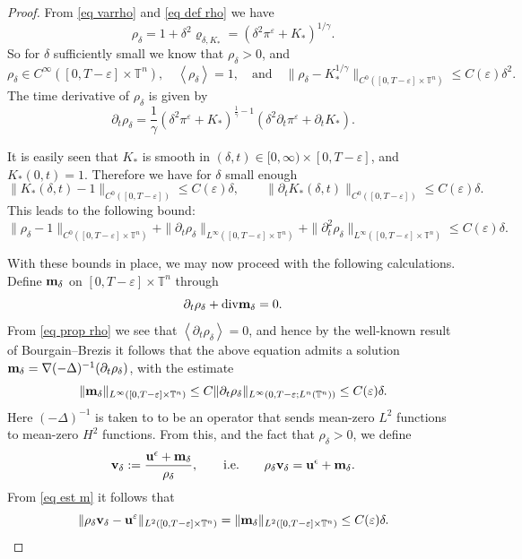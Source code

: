 \documentclass[12pt,reqno]{amsart}
\theoremstyle{definition}
\theoremstyle{remark}
\numberwithin{equation}{section}
\renewcommand{\u}{{\bf u}}
\newcommand{\Dv}{{\rm div}}
\newcommand{\T}{{\mathbb T}}
\renewcommand{\v}{{\bf v}}
\newcommand{\m}{{\bf m}}
\newcommand{\eps}{{\varepsilon}}
\begin{document}
\begin{proof}
From \eqref{eq varrho} and \eqref{eq def rho} we have 
\[
\rho_\delta = 1 + \delta^2 \varrho_{\delta, K_\ast} = (\delta^2 \pi^\varepsilon + K_\ast)^{1/\gamma}.
\]
So for $\delta$ sufficiently small we know that $\rho_\delta > 0$, and 
\begin{equation}\label{eq prop rho}
\rho_\delta \in C^\infty([0, T-\varepsilon] \times \T^n), \quad \left\langle \rho_\delta \right\rangle = 1, \quad \text{and} \quad \|\rho_{\delta} - K_\ast^{1/\gamma}\|_{C^0([0,T-\varepsilon] \times\mathbb{T}^n)} \le C(\varepsilon) \delta^2.
\end{equation}
The time derivative of $ \rho_{\delta} $ is given by
\[
\partial_t \rho_{\delta} = \frac{1}{\gamma} \left(\delta^2 \pi^{\varepsilon} + K_\ast \right)^{\frac{1}{\gamma} - 1} (\delta^2 \partial_t \pi^{\varepsilon} + \partial_t K_\ast).
\]

It is easily seen that $K_\ast$ is smooth in $(\delta, t) \in [0, \infty) \times [0, T - \varepsilon]$, and $K_\ast(0, t) = 1$. Therefore we have for $\delta$ small enough
\[
\| K_\ast(\delta, t) - 1 \|_{C^0([0, T - \varepsilon])} \le C(\varepsilon) \delta, \qquad \| \partial_t K_\ast(\delta, t) \|_{C^0([0, T - \varepsilon])} \le C(\varepsilon) \delta.
\]
This leads to the following bound:
\begin{equation}
\label{bound of density in delta}
\|\rho_{\delta} - 1\|_{C^0([0,T-\varepsilon] \times\mathbb{T}^n)} + \| \partial_t \rho_{\delta} \|_{L^\infty([0,T-\varepsilon] \times\mathbb{T}^n)} + \| \partial_t^2 \rho_{\delta} \|_{L^\infty([0,T-\varepsilon] \times\mathbb{T}^n)} \leq C(\varepsilon) \delta.
\end{equation} 

With these bounds in place, we may now proceed with the following calculations. Define $\m_\delta$ on $[0, T - \varepsilon] \times \mathbb{T}^n$ through
\[
\partial_t \rho_\delta + \Dv \m_\delta = 0.
\]
From \eqref{eq prop rho} we see that $\left\langle \partial_t \rho_\delta \right\rangle = 0$, and hence by the well-known result of Bourgain--Brezis \cite{BB} it follows that the above equation admits a solution $\m_\delta = \nabla (-\Delta)^{-1} (\partial_t \rho_\delta)$, with the estimate 
\begin{equation}\label{eq est m}
\|\m_\delta\|_{L^\infty([0,T-\varepsilon] \times\mathbb{T}^n)} \leq C \| \partial_t \rho_{\delta} \|_{L^\infty(0,T-\varepsilon; L^n(\mathbb{T}^n))} \le C(\varepsilon) \delta.
\end{equation}
Here $(-\Delta)^{-1}$ is taken to to be an operator that sends mean-zero $L^2$ functions to mean-zero $H^2$ functions. 
From this, and the fact that $\rho_\delta > 0$, we define
\[
\v_\delta := \frac{\u^\epsilon + \m_\delta}{\rho_\delta}, \qquad \text{i.e.} \qquad \rho_\delta \v_\delta = \u^\epsilon + \m_\delta.
\]
From \eqref{eq est m} it follows that
\begin{equation}
\label{m close}
\|\rho_{\delta}\v_{\delta}-\u^{\varepsilon}\|_{L^2([0,T-\varepsilon] \times\mathbb{T}^n)}=\| \m_{\delta}\|_{L^2([0,T-\varepsilon] \times\mathbb{T}^n)} \leq C(\eps) \delta.
\end{equation}


\end{proof}
\end{document}
